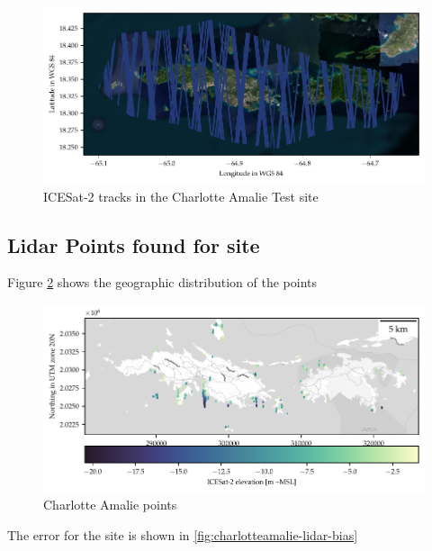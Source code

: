 \begin{figure}[h]
    \centering
    \includegraphics[width=\textwidth]{figures/Charlotteamalie_tracklines.pdf}
    \caption{ICESat-2 tracks in the Charlotte Amalie Test site}
    \label{fig:charlotteamalietracklines}
\end{figure}

\subsection{Lidar Points found for site}
Figure \ref{fig:pointmapcharlotteamalie} shows the geographic distribution of the points

\begin{figure}[h]
    \centering
    \includegraphics[width=\textwidth]{figures/Charlotteamalie_photon_map.pdf}
    \caption{Charlotte Amalie points}
    \label{fig:pointmapcharlotteamalie}
\end{figure}

The error for the site is shown in \ref{fig:charlotteamalie-lidar-bias}

